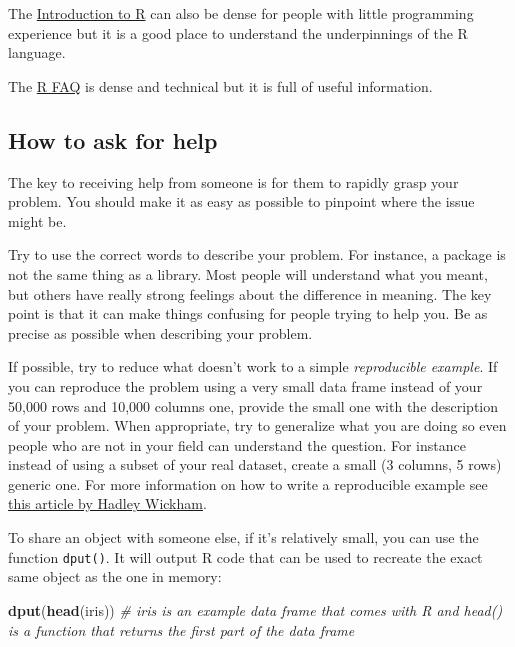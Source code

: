 \documentclass[
]{book}
\newenvironment{Shaded}{\begin{snugshade}}{\end{snugshade}}
\newcommand{\CommentTok}[1]{\textcolor[rgb]{0.56,0.35,0.01}{\textit{#1}}}
\newcommand{\KeywordTok}[1]{\textcolor[rgb]{0.13,0.29,0.53}{\textbf{#1}}}
\newcommand{\NormalTok}[1]{#1}
\begin{document}
The \href{http://cran.r-project.org/doc/manuals/R-intro.pdf}{Introduction to R} can
also be dense for people with little programming experience but it is a good
place to understand the underpinnings of the R language.

The \href{http://cran.r-project.org/doc/FAQ/R-FAQ.html}{R FAQ} is dense and technical
but it is full of useful information.

\hypertarget{how-to-ask-for-help}{%
\subsection{How to ask for help}\label{how-to-ask-for-help}}

The key to receiving help from someone is for them to rapidly grasp your
problem. You should make it as easy as possible to pinpoint where the issue
might be.

Try to use the correct words to describe your problem. For instance, a package
is not the same thing as a library. Most people will understand what you meant,
but others have really strong feelings about the difference in meaning. The key
point is that it can make things confusing for people trying to help you. Be as
precise as possible when describing your problem.

If possible, try to reduce what doesn't work to a simple \emph{reproducible
example}. If you can reproduce the problem using a very small data frame
instead of your 50,000 rows and 10,000 columns one, provide the small one with
the description of your problem. When appropriate, try to generalize what you
are doing so even people who are not in your field can understand the
question. For instance instead of using a subset of your real dataset, create a
small (3 columns, 5 rows) generic one. For more information on how to write a
reproducible example see \href{http://adv-r.had.co.nz/Reproducibility.html}{this article by Hadley Wickham}.

To share an object with someone else, if it's relatively small, you can use the
function \texttt{dput()}. It will output R code that can be used to recreate the exact
same object as the one in memory:

\begin{Shaded}
\begin{Highlighting}[]
\KeywordTok{dput}\NormalTok{(}\KeywordTok{head}\NormalTok{(iris)) }\CommentTok{# iris is an example data frame that comes with R and head() is a function that returns the first part of the data frame}
\end{Highlighting}
\end{Shaded}
\end{document}
